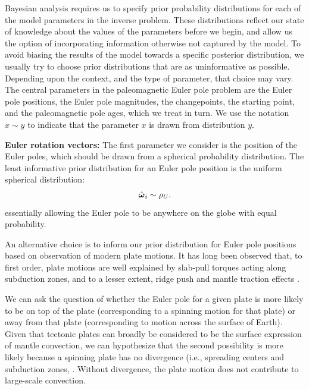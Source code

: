 \documentclass[11pt,letterpaper]{article}
\newcommand{\mitbf}[1]{\hbox{\mathversion{bold}$#1$}}
\begin{document}
Bayesian analysis requires us to specify prior probability distributions for each of the model parameters in the inverse problem. These distributions reflect our state of knowledge about the values of the parameters before we begin, and allow us the option of incorporating information otherwise not captured by the model. To avoid biasing the results of the model towards a specific posterior distribution, we usually try to choose prior distributions that are as uninformative as possible. Depending upon the context, and the type of parameter, that choice may vary. The central parameters in the paleomagnetic Euler pole problem are the Euler pole positions, the Euler pole magnitudes, the changepoints, the starting point, and the paleomagnetic pole ages, which we treat in turn. We use the notation $x \sim y$ to indicate that the parameter $x$ is drawn from distribution $y$.

\textbf{Euler rotation vectors:} 
The first parameter we consider is the position of the Euler poles, which should be drawn from a spherical probability distribution. The least informative prior distribution for an Euler pole position is the uniform spherical distribution:
\begin{equation}
\hat{\mitbf{\omega}}_i \sim \rho_U.
\end{equation}
essentially allowing the Euler pole to be anywhere on the globe with equal probability.

An alternative choice is to inform our prior distribution for Euler pole positions based on observation of modern plate motions. It has long been observed that, to first order, plate motions are well explained by slab-pull torques acting along subduction zones, and to a lesser extent, ridge push and mantle traction effects \citep{Forsyth1975a, Gordon1978a, Richardson1992a}. 

We can ask the question of whether the Euler pole for a given plate is more likely to be on top of the plate (corresponding to a spinning motion for that plate) or away from that plate (corresponding to motion across the surface of Earth). Given that tectonic plates can broadly be considered to be the surface expression of mantle convection, we can hypothesize that the second possibility is more likely because a spinning plate has no divergence (i.e., spreading centers and subduction zones, \citep{Forte1987a, Gable1991a}. Without divergence, the plate motion does not contribute to large-scale convection.
\end{document}
